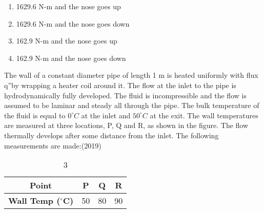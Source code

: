     \begin{enumerate}[label=(\Alph*)]
        \item 1629.6 N-m and the nose goes up
        \item 1629.6 N-m and the nose goes down
        \item 162.9 N-m and the nose goes up
        \item 162.9 N-m and the nose goes down
    \end{enumerate}
    \item The wall of a constant diameter pipe of length 1 m is heated uniformly with flux q''by wrapping a heater coil around it. The flow at the inlet to the pipe is hydrodynamically fully developed. The fluid is incompressible and the flow is assumed to be laminar and steady all through the pipe. The bulk temperature of the fluid is equal to  $0^{\circ}C$ at the inlet and $50^{\circ}C$ at the exit. The wall temperatures are measured at three locations, P, Q and R, as shown in the figure. The flow thermally develops  after some distance from the inlet. The following measurements are made:\hfill (2019)
    \begin{table}
        \centering
        \begin{tabular}{|c|c|c|c|}
            \hline
            \textbf{Point} & P & Q & R \\
            \hline
            \textbf{Wall Temp ($^{\circ}$C)} & 50 & 80 & 90 \\
            \hline
         \end{tabular}  %
        \caption{3}
    \end{table}

